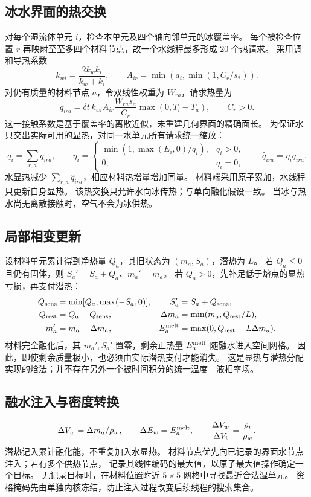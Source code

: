 \subsection{冰水界面的热交换}
对每个湿流体单元 $i$，检查本单元及四个轴向邻单元的冰覆盖率。
每个被检查位置 $r$ 再映射至至多四个材料节点，故一个水线程最多形成 20 个热请求。
采用调和导热系数
\begin{equation}
 k_{wi}=\frac{2k_wk_i}{k_w+k_i},\qquad
 A_{ir}=\min\left(a_i,\min(1,C_r/s_*)\right).
\end{equation}
对仍有质量的材料节点 $a$，令双线性权重为 $W_{ra}$，请求热量为
\begin{equation}
 q_{ira}=\delta t\,k_{wi}A_{ir}\frac{W_{ra}s_a}{C_r}
 \max(0,T_i-T_a),\qquad C_r>0.
\end{equation}
这一接触系数是基于覆盖率的离散近似，未重建几何界面的精确面长。
为保证水只交出实际可用的显热，对同一水单元所有请求统一缩放：
\begin{equation}
 q_i=\sum_{r,a}q_{ira},\qquad
 \eta_i=\begin{cases}\min(1,\max(E_i,0)/q_i),&q_i>0,\\0,&q_i=0,\end{cases}
 \qquad \widehat q_{ira}=\eta_iq_{ira}.
\end{equation}
水显热减少 $\sum_{r,a}\widehat q_{ira}$，相应材料热增量增加同量。
材料端采用原子累加，水线程只更新自身显热。
该热交换只允许水向冰传热；与单向融化假设一致。
当冰与热水尚无离散接触时，空气不会为冰供热。

\subsection{局部相变更新}
设材料单元累计得到净热量 $Q_a$，其旧状态为 $(m_a,S_a)$，潜热为 $L$。
若 $Q_a\leq0$ 且仍有固体，则 $S_a' = S_a+Q_a$、$m_a'=m_a$。
若 $Q_a>0$，先补足低于熔点的显热亏损，再支付潜热：
\begin{align}
 Q_{\rm sens}&=\min[Q_a,\max(-S_a,0)],& S_a'&=S_a+Q_{\rm sens},\\
 Q_{\rm rest}&=Q_a-Q_{\rm sens},&
 \Delta m_a&=\min(m_a,Q_{\rm rest}/L),\\
 m_a'&=m_a-\Delta m_a,&
 E_a^{\rm melt}&=\max(0,Q_{\rm rest}-L\Delta m_a).
 \label{eq:melt-rule}
\end{align}
材料完全融化后，其 $m_a',S_a'$ 置零，剩余正热量 $E_a^{\rm melt}$ 随融水进入空间网格。
因此，即使剩余质量极小，也必须由实际潜热支付才能消失。
这是显热与潜热分配实现的焓法；并不存在另外一个被时间积分的统一温度—液相率场。

\subsection{融水注入与密度转换}
\begin{equation}
 \Delta V_w=\Delta m_a/\rho_w,
 \qquad \Delta E_w=E_a^{\rm melt},\qquad
 \frac{\Delta V_w}{\Delta V_i}=\frac{\rho_i}{\rho_w}.
 \label{eq:melt-volume}
\end{equation}
潜热记入累计融化能，不重复加入水显热。
材料节点优先向已记录的界面水节点注入；若有多个供热节点，
记录其线性编码的最大值，以原子最大值操作确定一个目标。
无记录目标时，在材料位置附近 $5\times5$ 网格中寻找最近合法湿单元。
资格掩码先由单独内核冻结，防止注入过程改变后续线程的搜索集合。

